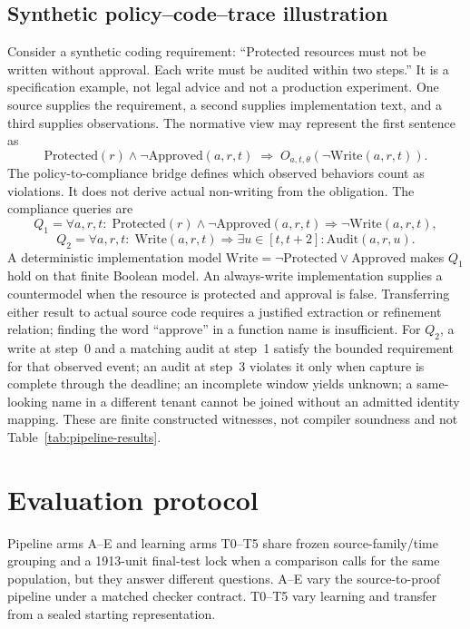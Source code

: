 \documentclass{article}
\begin{document}
\subsection{Synthetic policy--code--trace illustration}
Consider a synthetic coding requirement: ``Protected resources must not be written without approval. Each write must be audited within two steps.'' It is a specification example, not legal advice and not a production experiment. One source supplies the requirement, a second supplies implementation text, and a third supplies observations. The normative view may represent the first sentence as
\begin{equation}
\mathrm{Protected}(r)\land\neg\mathrm{Approved}(a,r,t)\;\Rightarrow\; O_{a,t,\theta}(\neg\mathrm{Write}(a,r,t)).
\label{eq:obl}
\end{equation}
The policy-to-compliance bridge defines which observed behaviors count as violations. It does not derive actual non-writing from the obligation. The compliance queries are
\begin{equation}
Q_1=\forall a,r,t:\;\mathrm{Protected}(r)\land\neg\mathrm{Approved}(a,r,t)\Rightarrow\neg\mathrm{Write}(a,r,t),
\label{eq:q1}
\end{equation}
\begin{equation}
Q_2=\forall a,r,t:\;\mathrm{Write}(a,r,t)\Rightarrow\exists u\in[t,t+2]:\mathrm{Audit}(a,r,u).
\label{eq:q2}
\end{equation}
A deterministic implementation model $\mathrm{Write}=\neg\mathrm{Protected}\lor\mathrm{Approved}$ makes $Q_1$ hold on that finite Boolean model. An always-write implementation supplies a countermodel when the resource is protected and approval is false. Transferring either result to actual source code requires a justified extraction or refinement relation; finding the word ``approve'' in a function name is insufficient. For $Q_2$, a write at step~0 and a matching audit at step~1 satisfy the bounded requirement for that observed event; an audit at step~3 violates it only when capture is complete through the deadline; an incomplete window yields unknown; a same-looking name in a different tenant cannot be joined without an admitted identity mapping. These are finite constructed witnesses, not compiler soundness and not Table~\ref{tab:pipeline-results}.

\section{Evaluation protocol}
Pipeline arms A--E and learning arms T0--T5 share frozen source-family/time grouping and a 1913-unit final-test lock when a comparison calls for the same population, but they answer different questions. A--E vary the source-to-proof pipeline under a matched checker contract. T0--T5 vary learning and transfer from a sealed starting representation.
\end{document}

